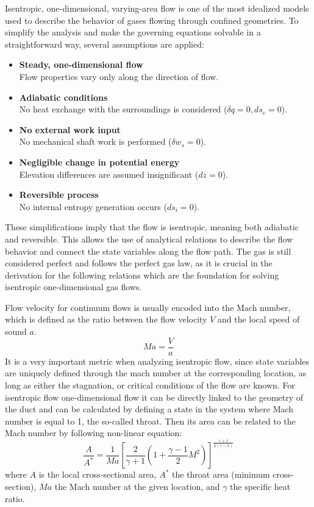 	Isentropic, one-dimensional, varying-area flow is one of the most idealized models used to describe the behavior of gases flowing through confined geometries.
	To simplify the analysis and make the governing equations solvable in a straightforward way, several assumptions are applied:
	\begin{itemize}
	    \item \textbf{Steady, one-dimensional flow}\\
		Flow properties vary only along the direction of flow.
	    \item \textbf{Adiabatic conditions}\\
		No heat exchange with the surroundings is considered ($\delta q = 0, ds_e = 0$).
	    \item \textbf{No external work input}\\
		No mechanical shaft work is performed ($\delta w_s = 0$).
	    \item \textbf{Negligible change in potential energy}\\
		Elevation differences are assumed insignificant ($dz = 0$).
	    \item \textbf{Reversible process}\\
		No internal entropy generation occurs ($ds_i = 0$).
	\end{itemize}
	These simplifications imply that the flow is isentropic, meaning both adiabatic and reversible.
	This allows the use of analytical relations to describe the flow behavior and connect the state variables along the flow path.
	The gas is still considered perfect and follows the perfect gas law, as it is crucial in the derivation for the following relations which are the foundation for solving isentropic one-dimensional gas flows.

	Flow velocity for continuum flows is usually encoded into the Mach number, which is defined as the ratio between the flow velocity $V$ and the local speed of sound $a$.
	\begin{equation}
		Ma = \frac{V}{a}
		\label{eq:mach-number}
	\end{equation}
	It is a very important metric when analyzing isentropic flow, since state variables are uniquely defined through the mach number at the corresponding location, as long as either the stagnation, or critical conditions of the flow are known.
	For isentropic flow one-dimensional flow it can be directly linked to the geometry of the duct and can be calculated by defining a state in the system where Mach number is equal to 1, the so-called throat.
	Then its area can be related to the Mach number by following non-linear equation:
	\begin{equation}
		\frac{A}{A^*} = \frac{1}{Ma} \left[ \frac{2}{\gamma + 1} \left( 1 + \frac{\gamma - 1}{2} M^2 \right) \right]^{\frac{\gamma + 1}{2(\gamma - 1)}}
		\label{eq:area_ratio_mach}
	\end{equation}
	where $A$ is the local cross-sectional area, $A^*$ the throat area (minimum cross-section), $Ma$ the Mach number at the given location, and $\gamma$ the specific heat ratio.

